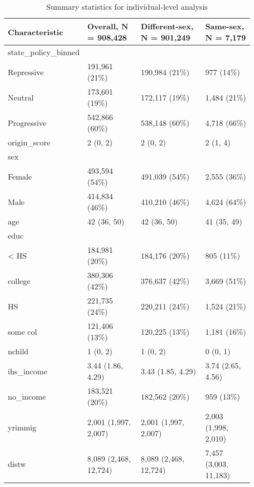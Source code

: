 \documentclass[
  11pt,
]{article}
\begin{document}
\begin{table}

\caption{\label{tab:desc-table-ind}Summary statistics for individual-level analysis}
\centering
\begin{tabular}[t]{llll}
\toprule
Characteristic & Overall, N = 908,428 & Different-sex, N = 901,249 & Same-sex, N = 7,179\\
\midrule
state\_policy\_binned &  &  & \\
\hspace{1em}Repressive & 191,961 (21\%) & 190,984 (21\%) & 977 (14\%)\\
\hspace{1em}Neutral & 173,601 (19\%) & 172,117 (19\%) & 1,484 (21\%)\\
\hspace{1em}Progressive & 542,866 (60\%) & 538,148 (60\%) & 4,718 (66\%)\\
origin\_score & 2 (0, 2) & 2 (0, 2) & 2 (1, 4)\\
\addlinespace
sex &  &  & \\
\hspace{1em}Female & 493,594 (54\%) & 491,039 (54\%) & 2,555 (36\%)\\
\hspace{1em}Male & 414,834 (46\%) & 410,210 (46\%) & 4,624 (64\%)\\
age & 42 (36, 50) & 42 (36, 50) & 41 (35, 49)\\
educ &  &  & \\
\addlinespace
\hspace{1em}< HS & 184,981 (20\%) & 184,176 (20\%) & 805 (11\%)\\
\hspace{1em}college & 380,306 (42\%) & 376,637 (42\%) & 3,669 (51\%)\\
\hspace{1em}HS & 221,735 (24\%) & 220,211 (24\%) & 1,524 (21\%)\\
\hspace{1em}some col & 121,406 (13\%) & 120,225 (13\%) & 1,181 (16\%)\\
nchild & 1 (0, 2) & 1 (0, 2) & 0 (0, 1)\\
\addlinespace
ihs\_income & 3.44 (1.86, 4.29) & 3.43 (1.85, 4.29) & 3.74 (2.65, 4.56)\\
no\_income & 183,521 (20\%) & 182,562 (20\%) & 959 (13\%)\\
yrimmig & 2,001 (1,997, 2,007) & 2,001 (1,997, 2,007) & 2,003 (1,998, 2,010)\\
distw & 8,089 (2,468, 12,724) & 8,089 (2,468, 12,724) & 7,457 (3,003, 11,183)\\

\end{tabular}
\end{table}
\end{document}
